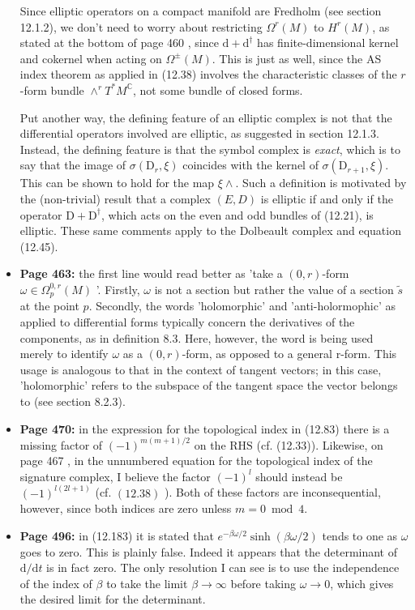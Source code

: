 \documentclass{article}
\begin{document}
\begin{itemize}
Since elliptic operators on a compact manifold are Fredholm (see section 12.1.2), we don't need to worry about restricting $\Omega^{r}(M)$ to $H^{r}(M)$, as stated at the bottom of page 460 , since $\mathrm{d}+\mathrm{d}^{\dagger}$ has finite-dimensional kernel and cokernel when acting on $\Omega^{\pm}(M)$. This is just as well, since the AS index theorem as applied in (12.38) involves the characteristic classes of the $r$-form bundle $\wedge^{r} T^{*} M^{\mathbb{C}}$, not some bundle of closed forms.

Put another way, the defining feature of an elliptic complex is not that the differential operators involved are elliptic, as suggested in section 12.1.3. Instead, the defining feature is that the symbol complex is \emph{exact}, which is to say that the image of $\sigma\left(\mathrm{D}_{r}, \xi\right)$ coincides with the kernel of $\sigma\left(\mathrm{D}_{r+1}, \xi\right)$. This can be shown to hold for the map $\xi \wedge$. Such a definition is motivated by the (non-trivial) result that a complex $(E, D)$ is elliptic if and only if the operator $\mathrm{D}+\mathrm{D}^{\dagger}$, which acts on the even and odd bundles of (12.21), is elliptic. These same comments apply to the Dolbeault complex and equation (12.45).

\item[] {\bf Page 463:} the first line would read better as 'take a $(0, r)$-form $\omega \in \Omega_{p}^{0, r}(M)$ '. Firstly, $\omega$ is not a section but rather the value of a section $\tilde{s}$ at the point $p$. Secondly, the words 'holomorphic' and 'anti-holormophic' as applied to differential forms typically concern the derivatives of the components, as in definition 8.3. Here, however, the word is being used merely to identify $\omega$ as a $(0, r)$-form, as opposed to a general r-form. This usage is analogous to that in the context of tangent vectors; in this case, 'holomorphic' refers to the subspace of the tangent space the vector belongs to (see section 8.2.3).

\item[] {\bf  Page 470:} in the expression for the topological index in (12.83) there is a missing factor of $(-1)^{m(m+1) / 2}$ on the $\mathrm{RHS}$ (cf. (12.33)). Likewise, on page 467 , in the unnumbered equation for the topological index of the signature complex, I believe the factor $(-1)^{l}$ should instead be $(-1)^{l(2 l+1)}$ (cf. $(12.38)$ ). Both of these factors are inconsequential, however, since both indices are zero unless $m=0 \bmod 4$.

\item[] {\bf  Page 496:} in (12.183) it is stated that $e^{-\beta \omega / 2} \sinh (\beta \omega / 2)$ tends to one as $\omega$ goes to zero. This is plainly false. Indeed it appears that the determinant of $\mathrm{d} / \mathrm{d} t$ is in fact zero. The only resolution I can see is to use the independence of the index of $\beta$ to take the limit $\beta \rightarrow \infty$ before taking $\omega \rightarrow 0$, which gives the desired limit for the determinant.

\end{itemize}
\end{document}
